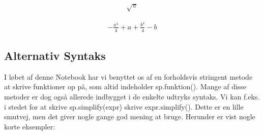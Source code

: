 \documentclass[letterpaper,10pt,english]{jupyterBook}
\begin{document}
\begin{sphinxVerbatim}[commandchars=\\\{\}]
     
   
\end{sphinxVerbatim}
\begin{equation*}
\begin{split}\displaystyle \sqrt{\pi}\end{split}
\end{equation*}
\begin{sphinxVerbatim}[commandchars=\\\{\}]
    
      

   
\end{sphinxVerbatim}
\begin{equation*}
\begin{split}\displaystyle - \frac{a^{4}}{4} + a + \frac{b^{4}}{4} - b\end{split}
\end{equation*}

\subsection{Alternativ Syntaks}
\label{\detokenize{notebooks/sympy/Notebook4:alternativ-syntaks}}
I løbet af denne Notebook har vi benyttet os af en forholdsvis stringent metode at skrive funktioner op på, som altid indeholder sp.funktion(). Mange af disse metoder er dog også allerede indbygget i de enkelte udtryks syntaks. Vi kan f.eks. i stedet for at skrive sp.simplify(expr) skrive expr.simplify(). Dette er en lille smutvej, men det giver nogle gange god mening at bruge. Herunder er vist nogle korte eksempler:
\end{document}
